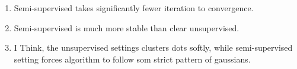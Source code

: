 \begin{answer}
\begin{enumerate}[label=\roman*.]
    \item Semi-supervised takes significantly fewer iteration to convergence.
    \item Semi-supervised is much more stable than clear unsupervised.
    \item I Think, the unsupervised settings clusters dots softly, while semi-supervised setting forces algorithm to follow som strict pattern of gaussians.
\end{enumerate}
\end{answer}
